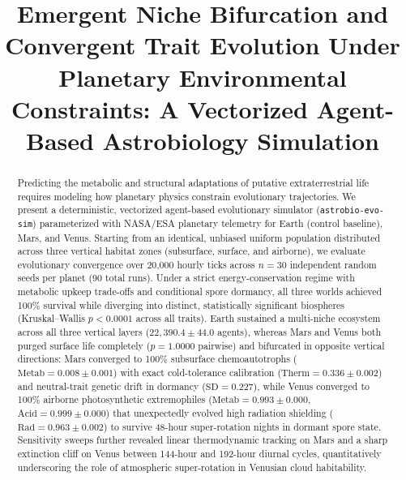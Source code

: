 \documentclass[conference]{IEEEtran}
\begin{document}
\title{Emergent Niche Bifurcation and Convergent Trait Evolution Under Planetary Environmental Constraints: A Vectorized Agent-Based Astrobiology Simulation}

\author{
}

\maketitle

\begin{abstract}
Predicting the metabolic and structural adaptations of putative extraterrestrial life requires modeling how planetary physics constrain evolutionary trajectories. We present a deterministic, vectorized agent-based evolutionary simulator (\texttt{astrobio-evo-sim}) parameterized with NASA/ESA planetary telemetry for Earth (control baseline), Mars, and Venus. Starting from an identical, unbiased uniform population distributed across three vertical habitat zones (subsurface, surface, and airborne), we evaluate evolutionary convergence over 20,000 hourly ticks across $n = 30$ independent random seeds per planet (90 total runs). Under a strict energy-conservation regime with metabolic upkeep trade-offs and conditional spore dormancy, all three worlds achieved 100\% survival while diverging into distinct, statistically significant biospheres (Kruskal--Wallis $p < 0.0001$ across all traits). Earth sustained a multi-niche ecosystem across all three vertical layers ($22{,}390.4 \pm 44.0$ agents), whereas Mars and Venus both purged surface life completely ($p = 1.0000$ pairwise) and bifurcated in opposite vertical directions: Mars converged to 100\% subsurface chemoautotrophs ($\text{Metab} = 0.008 \pm 0.001$) with exact cold-tolerance calibration ($\text{Therm} = 0.336 \pm 0.002$) and neutral-trait genetic drift in dormancy ($\text{SD} = 0.227$), while Venus converged to 100\% airborne photosynthetic extremophiles ($\text{Metab} = 0.993 \pm 0.000$, $\text{Acid} = 0.999 \pm 0.000$) that unexpectedly evolved high radiation shielding ($\text{Rad} = 0.963 \pm 0.002$) to survive 48-hour super-rotation nights in dormant spore state. Sensitivity sweeps further revealed linear thermodynamic tracking on Mars and a sharp extinction cliff on Venus between 144-hour and 192-hour diurnal cycles, quantitatively underscoring the role of atmospheric super-rotation in Venusian cloud habitability.
\end{abstract}
\end{document}
